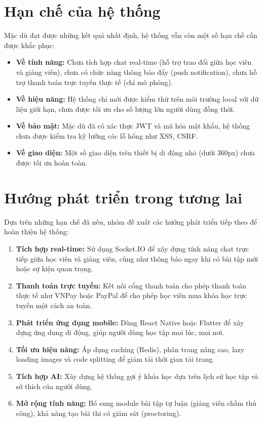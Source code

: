 \section{Hạn chế của hệ thống}
Mặc dù đạt được những kết quả nhất định, hệ thống vẫn còn một số hạn chế cần được khắc phục:
\begin{itemize}
    \item \textbf{Về tính năng:} Chưa tích hợp chat real-time (hỗ trợ trao đổi giữa học viên và giảng viên), chưa có chức năng thông báo đẩy (push notification), chưa hỗ trợ thanh toán trực tuyến thực tế (chỉ mô phỏng).
    \item \textbf{Về hiệu năng:} Hệ thống chỉ mới được kiểm thử trên môi trường local với dữ liệu giới hạn, chưa được tối ưu cho số lượng lớn người dùng đồng thời.
    \item \textbf{Về bảo mật:} Mặc dù đã có xác thực JWT và mã hóa mật khẩu, hệ thống chưa được kiểm tra kỹ lưỡng các lỗ hổng như XSS, CSRF.
    \item \textbf{Về giao diện:} Một số giao diện trên thiết bị di động nhỏ (dưới 360px) chưa được tối ưu hoàn toàn.
\end{itemize}

\section{Hướng phát triển trong tương lai}
Dựa trên những hạn chế đã nêu, nhóm đề xuất các hướng phát triển tiếp theo để hoàn thiện hệ thống:

\begin{enumerate}
    \item \textbf{Tích hợp real-time:} Sử dụng Socket.IO để xây dựng tính năng chat trực tiếp giữa học viên và giảng viên, cũng như thông báo ngay khi có bài tập mới hoặc sự kiện quan trọng.
    
    \item \textbf{Thanh toán trực tuyến:} Kết nối cổng thanh toán cho phép thanh toán thực tế như VNPay hoặc PayPal để cho phép học viên mua khóa học trực tuyến một cách an toàn.
    
    \item \textbf{Phát triển ứng dụng mobile:} Dùng React Native hoặc Flutter để xây dựng ứng dụng di động, giúp người dùng học tập mọi lúc, mọi nơi.
    
    \item \textbf{Tối ưu hiệu năng:} Áp dụng caching (Redis), phân trang nâng cao, lazy loading images và code splitting để giảm tải thời gian tải trang.
    
    \item \textbf{Tích hợp AI:} Xây dựng hệ thống gợi ý khóa học dựa trên lịch sử học tập và sở thích của người dùng.
    
    \item \textbf{Mở rộng tính năng:} Bổ sung module bài tập tự luận (giảng viên chấm thủ công), khả năng tạo bài thi có giám sát (proctoring).
\end{enumerate}

